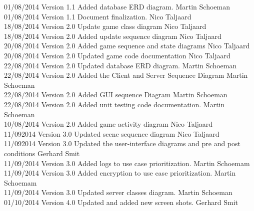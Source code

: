 \documentclass[letterpaper]{article}
\begin{document}
\begin{tabbing}
			01/08/2014  \> Version 1.1  \> Added database ERD diagram.					\> Martin Schoeman\\
			01/08/2014  \> Version 1.1  \> Document finalization.						\> Nico Taljaard\\
			18/08/2014  \> Version 2.0  \> Update game class diagram					\> Nico Taljaard\\
			18/08/2014  \> Version 2.0  \> Added update sequence diagram				\> Nico Taljaard\\
			20/08/2014  \> Version 2.0  \> Added game sequence and state diagrams		\> Nico Taljaard\\
			20/08/2014  \> Version 2.0  \> Updated game code documentation				\> Nico Taljaard\\
			22/08/2014  \> Version 2.0  \> Updated database ERD diagram.				\> Martin Schoeman\\
			22/08/2014  \> Version 2.0  \> Added the Client and Server Sequence Diagram	\> Martin Schoeman\\
			22/08/2014  \> Version 2.0  \> Added GUI sequence Diagram					\> Martin Schoeman\\
			22/08/2014  \> Version 2.0  \> Added unit testing code documentation.		\> Martin Schoeman\\
			10/08/2014	\> Version 2.0	\> Added game activity diagram					\> Nico Taljaard\\
			11/092014	\> Version 3.0	\> Updated scene sequence diagram				\> Nico Taljaard\\
			11/092014	\> Version 3.0	\> Updated the user-interface diagrams and pre and post conditions			\> Gerhard Smit\\
			11/09/2014	\> Version 3.0  \> Added logs to use case prioritization.		\> Martin Schoemam\\
			11/09/2014	\> Version 3.0  \> Added encryption to use case prioritization.	\> Martin Schoemam\\
			11/09/2014	\> Version 3.0	\> Updated server classes diagram.				\> Martin Schoeman\\
			01/10/2014 \> Version 4.0 \> Updated and added new screen shots.			\> Gerhard Smit \\
			
		\end{tabbing}
		
	\newpage
		\renewcommand\contentsname{TABLE OF CONTENTS}
		\newcommand\contentsnameLC{\colorbox{blue}{\makebox[\textwidth-2\fboxsep][l]{\bfseries\color{white} Table of Contents}}}
		
		\renewcommand{\cftdot}{}
		\hypersetup{linktocpage}
		\tableofcontents
		
\end{document}
